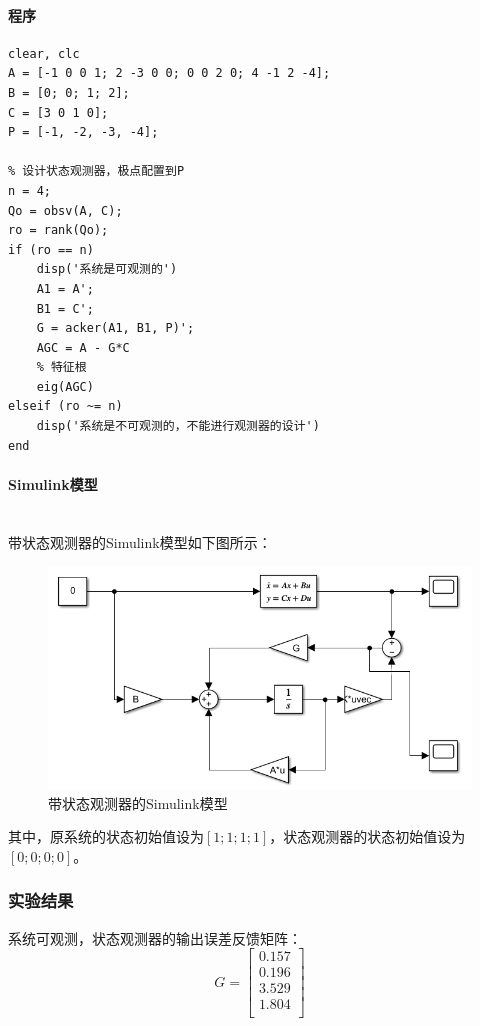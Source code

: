 \documentclass[UTF8]{article}
\begin{document}
\paragraph{程序}
\begin{lstlisting}
clear, clc
A = [-1 0 0 1; 2 -3 0 0; 0 0 2 0; 4 -1 2 -4];
B = [0; 0; 1; 2];
C = [3 0 1 0];
P = [-1, -2, -3, -4];

% 设计状态观测器，极点配置到P
n = 4;
Qo = obsv(A, C);
ro = rank(Qo);
if (ro == n)
    disp('系统是可观测的')
    A1 = A';
    B1 = C';
    G = acker(A1, B1, P)';
    AGC = A - G*C
    % 特征根
    eig(AGC)
elseif (ro ~= n)
    disp('系统是不可观测的，不能进行观测器的设计') 
end
\end{lstlisting}


\paragraph{Simulink模型}~{}
\\
带状态观测器的Simulink模型如下图所示：
\begin{figure}[H]
    \centering %
    \includegraphics[width=.8\textwidth]{figure/exp3_2_model.png} 
    \caption{带状态观测器的Simulink模型} %
\end{figure}
其中，原系统的状态初始值设为$[1; 1; 1; 1]$，状态观测器的状态初始值设为$[0; 0; 0; 0]$。


\subsubsection{实验结果}
\noindent 系统可观测，状态观测器的输出误差反馈矩阵：
$$
G = 
\begin{bmatrix}
0.157 \\
0.196 \\
3.529 \\
1.804 \\
\end{bmatrix}
$$
\end{document}
